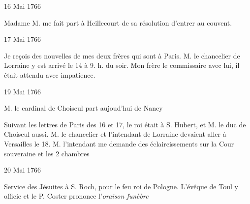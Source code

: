                      \begin{diary}{16 Mai 1766}{}


                           Madame M.  me fait part à Heillecourt
                           de sa résolution d'entrer au couvent. \bigskip


                     \end{diary}

                     \begin{diary}{17 Mai 1766}{}

                         Je reçois des nouvelles de mes deux frères
                           qui sont à Paris. M. le chancelier de Lorraine
                           y est arrivé le 14 à 9. h. du soir.
                              Mon
                              frère le commissaire avec lui, il était attendu
                           avec impatience. \bigskip


                     \end{diary}

                     \begin{diary}{19 Mai 1766}{}


                           M. le cardinal de Choiseul part
                           aujoud'hui
                           de Nancy
                        \bigskip



                           Suivant les lettres de Paris des
                              16 et 17,
                           le roi était à
                              S. Hubert, et M. le duc de
                              Choiseul aussi. M.
                              le chancelier et l'intendant
                              de Lorraine devaient aller à Versailles
                           le 18.
                           M. l'intendant me demande des éclaircissements
                           sur la Cour souveraine et les 2 chambres
                        \bigskip


                     \end{diary}

                     \begin{diary}{20 Mai 1766}{}

                         Service des Jésuites à S.
                              Roch, pour le feu
                              roi de Pologne. L'évêque de Toul
                           y officie et
                           le P. Coster prononce
                                 l'\emph{oraison funèbre}
                        \bigskip


                     \end{diary}

